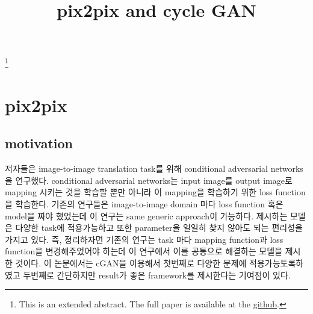 \documentclass[extendedabs]{bmvc2k}
\begin{document}
\title{pix2pix and cycle GAN }
\maketitle
\let\thefootnote\relax\footnote{This is an extended abstract. The full paper is available at the \href{https://github.com/LeeGwanHui/TIL/tree/main/deeplearning_ham}{github}. }
\vspace{-0.2in}

\section{pix2pix\cite{isola2017image}}
 \subsection{motivation}
  \quad 저자들은 image-to-image translation task를 위해 conditional adversarial networks을 연구했다. conditional adversarial networks는 input image를 output image로 
  mapping 시키는 것을 학습할 뿐만 아니라 이 mapping을 학습하기 위한 loss function을 학습한다. 기존의 연구들은 image-to-image domain 마다 loss function 혹은 model을 짜야 했었는데 
  이 연구는 same generic approach이 가능하다. 제시하는 모델은 다양한 task에 적용가능하고 또한 parameter을 일일히 찾지 않아도 되는 편리성을 가지고 있다. 
  즉, 정리하자면 기존의 연구는 task 마다 mapping function과 loss function을 변경해주었어야 하는데 이 연구에서 이를 공통으로 해결하는 모델을 제시한 것이다.
  이 논문에서는 cGAN을 이용해서 첫번째로 다양한 문제에 적용가능토록하였고 두번째로 간단하지만 result가 좋은 framework를 제시한다는 기여점이 있다.
\end{document}

